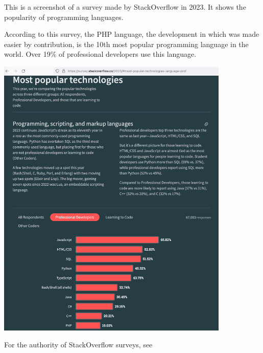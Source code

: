 
This is a screenshot of a survey made by StackOverflow in 2023.
It shows the popularity of programming languages.

According to this survey, the PHP language,
the development in which was made easier by \mrls contribution,
is the 10th most popular programming language in the world.
Over 19\% of professional developers use this language.

\begin{center}
    \includegraphics[width=30em]{php-stackoverflow}
\end{center}

For the authority of StackOverflow surveys, see 

\pagebreak
